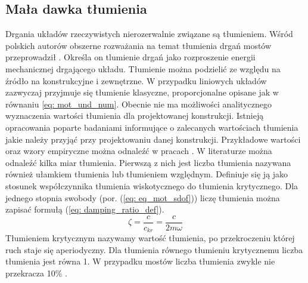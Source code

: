 \subsection{Mała dawka tłumienia}
Drgania układów rzeczywistych nierozerwalnie związane są tłumieniem.  Wśród polskich autorów obszerne rozważania na temat tłumienia drgań mostów przeprowadził \cite{Salamak2003}. Określa on tlumienie drgań jako rozproszenie energii mechanicznej drgającego układu. Tłumienie można podzielić ze względu na źródło na konstrukcyjne i zewnętrzne. W przypadku liniowych układów zazwyczaj przyjmuje się tłumienie klasyczne, proporcjonalne opisane jak w równaniu \ref{eq: mot_und_num}.
Obecnie nie ma możliwości analitycznego wyznaczenia wartości tłumienia dla projektowanej konstrukcji. Istnieją opracowania poparte badaniami informujące o zalecanych wartościach tłumienia jakie należy przyjąć przy projektowaniu danej konstrukcji. Przykładowe wartości oraz wzory empiryczne można odnaleźć w pracach \parencite{Salamak2003, Fryba1999,Bachmann2012,Yamaguchi1997}.
W literaturze można odnaleźć kilka miar tłumienia. Pierwszą z nich jest liczba tłumienia  nazywana również ułamkiem tłumienia lub tłumieniem względnym. Definiuje się ją jako stosunek współczynnika tłumienia wiskotycznego do tłumienia krytycznego. Dla jednego stopnia swobody (por. (\ref{eq: eq_mot_sdof})) liczę tłumienia można zapisać formułą (\ref{eq: damping_ratio_def}).
\begin{equation} \label{eq: damping_ratio_def}
	\zeta = \frac{c}{c_{kr}}=\frac{c}{2m\omega}
\end{equation}
Tłumieniem krytycznym nazywamy wartość tłumienia, po przekroczeniu której ruch staje się aperiodyczny. Dla tłumienia równego tłumieniu krytycznemu liczba tłumienia jest równa 1. W przypadku mostów liczba tłumienia zwykle nie przekracza 10\% \parencite{Salamak2003}. 

